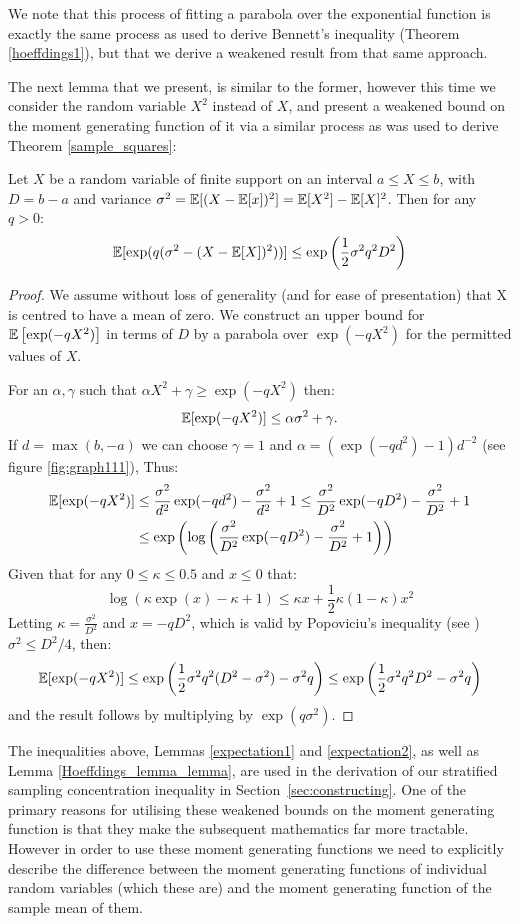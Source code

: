 We note that this process of fitting a parabola over the exponential function is exactly the same process as used to derive Bennett's inequality (Theorem \ref{hoeffdings1}), but that we derive a weakened result from that same approach.

The next lemma that we present, is similar to the former, however this time we consider the random variable $X^2$ instead of $X$, and present a weakened bound on the moment generating function of it via a similar process as was used to derive Theorem \ref{sample_squares}: 

\begin{lemma}\label{expectation2}
Let $X$ be a random variable of finite support on an interval $a\le X\le b$, with $D=b-a$ and variance $\sigma^2 = \operatorname{\mathbb{E}}[(X-\operatorname{\mathbb{E}}[x])^2] = \operatorname{\mathbb{E}}[X^2]-\operatorname{\mathbb{E}}[X]^2$. Then for any $q>0$:
$$\operatorname{\mathbb{E}}[\exp(q(\sigma^2-(X-\operatorname{\mathbb{E}}[X])^2))] \le \exp\left(\frac{1}{2}\sigma^2q^2D^2\right)$$
\end{lemma}
\begin{proof}
We assume without loss of generality (and for ease of presentation) that X is centred to have a mean of zero.
We construct an upper bound for $\operatorname{\mathbb{E}}\left[\exp(-qX^2)\right]$ in terms of $D$ by a parabola over $\exp(-qX^2)$ for the permitted values of $X$.

For an $\alpha,\gamma$ such that $\alpha X^2+\gamma\ge \exp(-qX^2)$ then:
$$ \operatorname{\mathbb{E}}[\exp(-qX^2)] \le \alpha \sigma^2 + \gamma.$$
If $d=\max(b,-a)$ we can choose $\gamma=1$ and $\alpha=(\exp(-q d^2)-1)d^{-2}$ (see figure \ref{fig:graph111}), Thus:
\begin{align*}
\operatorname{\mathbb{E}}[\exp(-q X^2)] &\le \frac{\sigma^2}{d^2}\exp(-q d^2)-\frac{\sigma^2}{d^2} + 1\le \frac{\sigma^2}{D^2}\exp(-q D^2)-\frac{\sigma^2}{D^2} + 1 \\
&\le \exp\left(\log\left(\frac{\sigma^2}{D^2}\exp(-q D^2)-\frac{\sigma^2}{D^2} + 1\right)\right)
\end{align*}
Given that for any $0\le \kappa \le 0.5$ and $x\le 0$ that: $$\log\left(\kappa\exp(x)-\kappa + 1\right) \le \kappa x+\frac{1}{2}\kappa(1-\kappa)x^2$$
Letting $\kappa=\frac{\sigma^2}{D^2}$ and $x=-qD^2$, which is valid by Popoviciu's inequality (see \cite{zbMATH05780164}) $\sigma^2\le D^2/4$, then:
$$ \operatorname{\mathbb{E}}[\exp(-q X^2)] \le \exp\left(\frac{1}{2}\sigma^2q^2(D^2-\sigma^2)-\sigma^2q\right) \le \exp\left(\frac{1}{2}\sigma^2q^2D^2-\sigma^2q\right)$$
and the result follows by multiplying by $\exp(q\sigma^2)$.
\end{proof}

The inequalities above, Lemmas \ref{expectation1} and \ref{expectation2}, as well as Lemma \ref{Hoeffdings_lemma_lemma}, are used in the derivation of our stratified sampling concentration inequality in Section~\ref{sec:constructing}. One of the primary reasons for utilising these weakened bounds on the moment generating function is that they make the subsequent mathematics far more tractable.
However in order to use these moment generating functions we need to explicitly describe the difference between the moment generating functions of individual random variables (which these are) and the moment generating function of the sample mean of them.

